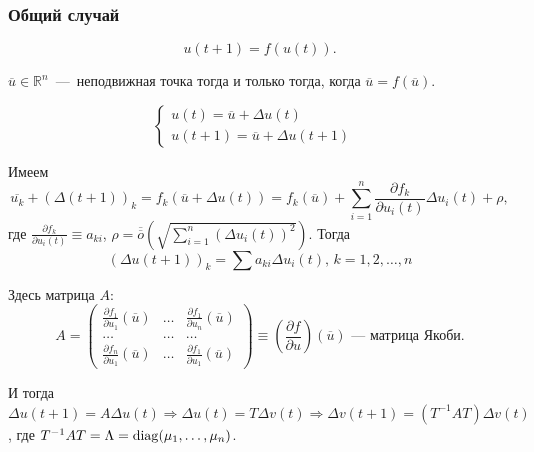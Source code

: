 \subsubsection*{Общий случай}

\begin{equation*}
u(t+1) = f(u(t)).
\end{equation*}

\begin{definition}
$\overline{u} \in \mathbb{R}^n$~---~неподвижная точка тогда и только тогда, когда $\overline{u} = f(\overline{u})$.
\end{definition}

\begin{equation*}
\begin{cases}
u(t) = \overline{u} + \Delta u(t)&\\
u(t+1) = \overline{u} + \Delta u(t+1)&
\end{cases}
\end{equation*}

Имеем 
\begin{equation*}
\overline{u_k} + (\Delta(t+1))_k = f_k (\overline{u} + \Delta u(t)) = f_k (\overline{u})+\sum \limits_{i = 1}^n \frac{\partial f_k}{\partial u_i(t)} \Delta u_i(t) + \rho,
\end{equation*}
где $\frac{\partial f_k}{\partial u_i(t)} \equiv a_{ki}$, $\rho = \overline{\overline{o}}\left(\sqrt{\sum \limits_{i = 1}^n (\Delta u_i(t))^2}\right)$. Тогда 
\begin{equation*}
(\Delta u(t+1))_k = \sum a_{ki} \Delta u_i(t), \, k = 1,2, \ldots , n
\end{equation*}

Здесь матрица $A$:
\begin{equation*}
A = \begin{pmatrix} \frac{\partial f_1}{\partial u_1} (\overline{u}) & \ldots & \frac{\partial f_1}{\partial u_n} (\overline{u}) \\ \ldots & \ldots & \ldots \\ \frac{\partial f_n}{\partial u_1}  (\overline{u}) & \ldots & \frac{\partial f_1}{\partial u_1} (\overline{u}) \end{pmatrix} \equiv \left(\frac{\partial f}{\partial u} \right)(\overline{u}) \text{~---~матрица Якоби.}
\end{equation*}

И тогда $\Delta u(t+1) = A \Delta u (t) \Rightarrow \Delta u(t) = T \Delta v(t) \Rightarrow \Delta v(t+1) = (T^{-1} A T) \Delta v(t)$, где $T^{-1} A T=\Lambda = \operatorname{diag}(\mu_1, \ldots, \mu_n)$.